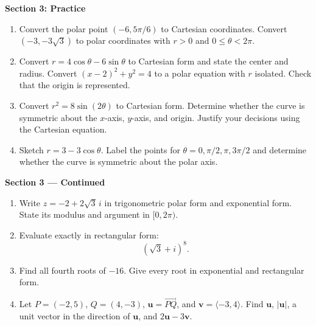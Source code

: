 \documentclass[11pt]{article}
\begin{document}
\newpage
\begin{center}{\large\textbf{Section 3: Practice}}\end{center}
\begin{enumerate}[leftmargin=*,itemsep=0pt,series=chapterNine]
  \item Convert the polar point $(-6,5\pi/6)$ to Cartesian coordinates.
  Convert $(-3,-3\sqrt3)$ to polar coordinates with $r>0$ and
  $0\le\theta<2\pi$.
  \par{}

  \item Convert $r=4\cos\theta-6\sin\theta$ to Cartesian form and state
  the center and radius. Convert $(x-2)^2+y^2=4$ to a polar equation
  with $r$ isolated. Check that the origin is represented.
  \par{}

  \item Convert $r^2=8\sin(2\theta)$ to Cartesian form.
  Determine whether the curve is symmetric about the $x$-axis, $y$-axis,
  and origin. Justify your decisions using the Cartesian equation.
  \par{}

  \item Sketch $r=3-3\cos\theta$. Label the points for
  $\theta=0,\pi/2,\pi,3\pi/2$ and determine whether the curve is symmetric
  about the polar axis.
  \par{}
\end{enumerate}

\newpage
\begin{center}{\large\textbf{Section 3 --- Continued}}\end{center}
\begin{enumerate}[leftmargin=*,itemsep=0pt,resume=chapterNine]
  \item Write $z=-2+2\sqrt3\,i$ in trigonometric polar form and exponential
  form. State its modulus and argument in $[0,2\pi)$.
  \par{}

  \item Evaluate exactly in rectangular form:
  \[
    (\sqrt3+i)^8.
  \]
  \par{}

  \item Find all fourth roots of $-16$. Give every root in exponential
  and rectangular form.
  \par{}

  \item Let $P=(-2,5)$, $Q=(4,-3)$, $\mathbf u=\overrightarrow{PQ}$, and
  $\mathbf v=\langle-3,4\rangle$. Find $\mathbf u$, $|\mathbf u|$, a unit
  vector in the direction of $\mathbf u$, and $2\mathbf u-3\mathbf v$.
  \par{}
\end{enumerate}
\end{document}

